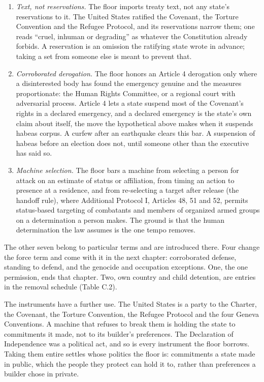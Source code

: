 \begin{enumerate}
\item[1.] \emph{Text, not reservations.} The floor imports treaty text, not any state's reservations to it. The United States ratified the Covenant, the Torture Convention and the Refugee Protocol, and its reservations narrow them; one reads “cruel, inhuman or degrading” as whatever the Constitution already forbids. A reservation is an omission the ratifying state wrote in advance; taking a set from someone else is meant to prevent that.
\item[2.] \emph{Corroborated derogation.} The floor honors an Article 4 derogation only where a disinterested body has found the emergency genuine and the measures proportionate: the Human Rights Committee, or a regional court with adversarial process. Article 4 lets a state suspend most of the Covenant's rights in a declared emergency, and a declared emergency is the state's own claim about itself, the move the hypothetical above makes when it suspends habeas corpus. A curfew after an earthquake clears this bar. A suspension of habeas before an election does not, until someone other than the executive has said so.
\item[3.] \emph{Machine selection.} The floor bars a machine from selecting a person for attack on an estimate of status or affiliation, from timing an action to presence at a residence, and from re-selecting a target after release (the handoff rule), where Additional Protocol I, Articles 48, 51 and 52, permits status-based targeting of combatants and members of organized armed groups on a determination a person makes. The ground is that the human determination the law assumes is the one tempo removes.
\end{enumerate}

The other seven belong to particular terms and are introduced there. Four change the force term and come with it in the next chapter: corroborated defense, standing to defend, and the genocide and occupation exceptions. One, the one permission, ends that chapter. Two, own country and child detention, are entries in the removal schedule (Table C.2).

The instruments have a further use. The United States is a party to the Charter, the Covenant, the Torture Convention, the Refugee Protocol and the four Geneva Conventions. A machine that refuses to break them is holding the state to commitments it made, not to its builder's preferences. The Declaration of Independence was a political act, and so is every instrument the floor borrows. Taking them entire settles whose politics the floor is: commitments a state made in public, which the people they protect can hold it to, rather than preferences a builder chose in private.

